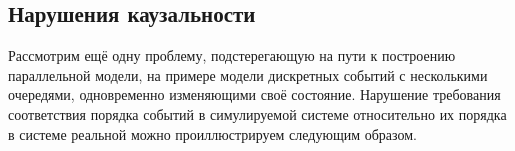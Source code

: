 \subsection[Нарушения каузальности]{Нарушения каузальности}

Рассмотрим ещё одну проблему, подстерегающую на пути к построению параллельной модели, на примере модели дискретных событий с несколькими очередями, одновременно изменяющими своё состояние. Нарушение требования соответствия порядка событий в симулируемой системе относительно их порядка в системе реальной можно  проиллюстрируем следующим образом.

% 
%     
%     
%     
%     
%     
%     
%     
%     

